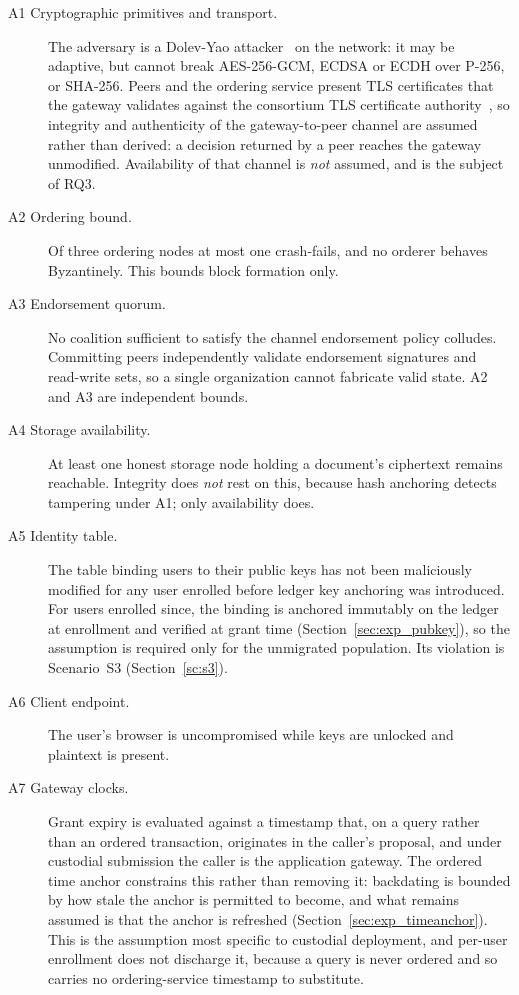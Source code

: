 \documentclass[preprint,12pt]{elsarticle}
\begin{document}
\begin{description}
\item[A1 Cryptographic primitives and transport.] The adversary is a Dolev-Yao
attacker~\cite{dolev1983security} on the network: it may be adaptive, but cannot
break AES-256-GCM, ECDSA or ECDH over P-256, or SHA-256. Peers and the ordering
service present TLS certificates that the gateway validates against the
consortium TLS certificate authority~\cite{rescorla2018tls}, so integrity and
authenticity of the gateway-to-peer channel are assumed rather than derived: a
decision returned by a peer reaches the gateway unmodified. Availability of that
channel is \emph{not} assumed, and is the subject of RQ3.

\item[A2 Ordering bound.] Of three ordering nodes at most one crash-fails, and
no orderer behaves Byzantinely. This bounds block formation only.

\item[A3 Endorsement quorum.] No coalition sufficient to satisfy the channel
endorsement policy colludes. Committing peers independently validate
endorsement signatures and read-write sets, so a single organization cannot
fabricate valid state. A2 and A3 are independent bounds.

\item[A4 Storage availability.] At least one honest storage node holding a
document's ciphertext remains reachable. Integrity does \emph{not} rest on
this, because hash anchoring detects tampering under A1; only availability
does.

\item[A5 Identity table.] The table binding users to their public keys has not
been maliciously modified for any user enrolled before ledger key anchoring was
introduced. For users enrolled since, the binding is anchored immutably on the
ledger at enrollment and verified at grant time
(Section~\ref{sec:exp_pubkey}), so the assumption is required only for the
unmigrated population. Its violation is Scenario~S3 (Section~\ref{sc:s3}).

\item[A6 Client endpoint.] The user's browser is uncompromised while keys are
unlocked and plaintext is present.

\item[A7 Gateway clocks.] Grant expiry is evaluated against a timestamp that,
on a query rather than an ordered transaction, originates in the caller's
proposal, and under custodial submission the caller is the application
gateway. The ordered time anchor constrains this rather than removing it:
backdating is bounded by how stale the anchor is permitted to become, and what
remains assumed is that the anchor is refreshed
(Section~\ref{sec:exp_timeanchor}). This is the assumption most specific to
custodial deployment, and per-user enrollment does not discharge it, because a
query is never ordered and so carries no ordering-service timestamp to
substitute.
\end{description}
\end{document}

